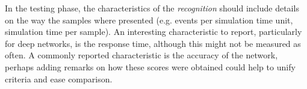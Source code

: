 
In the testing phase, the characteristics of the \emph{recognition} should include details on the way the samples where presented (e.g. events per simulation time unit, simulation time per sample). An interesting characteristic to report, particularly for deep networks, is the response time, although this might not be measured as often. A commonly reported characteristic is the accuracy of the network, perhaps adding remarks on how these scores were obtained could help to unify criteria and ease comparison.











